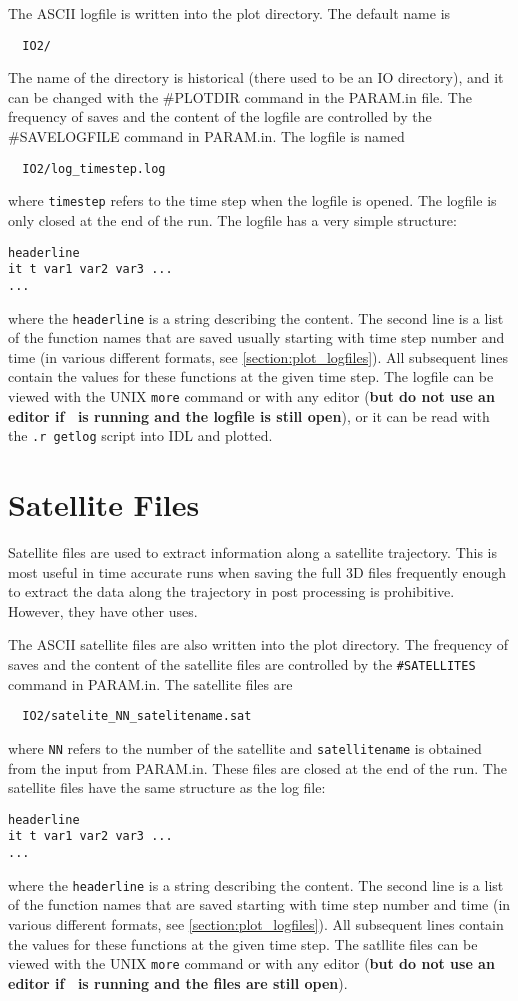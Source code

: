 The ASCII logfile is written into the plot directory. The default name is
\begin{verbatim}
  IO2/
\end{verbatim}
The name of the directory is historical (there used to be an IO directory),
and it can be changed with the \#PLOTDIR command in the PARAM.in file.
The frequency of saves and the content of the logfile are controlled by
the \#SAVELOGFILE command in PARAM.in. The logfile is named 
\begin{verbatim}
  IO2/log_timestep.log
\end{verbatim}
where {\tt timestep} refers to the time step when the logfile
is opened. The logfile is only closed at the end of the run.
The logfile has a very simple structure:
\begin{verbatim}
headerline
it t var1 var2 var3 ...
...
\end{verbatim}
where the {\tt headerline} is a string describing the content.
The second line is a list of the function names that are saved usually
starting with time step number and time (in various different formats, see
\ref{section:plot_logfiles}). 
All subsequent lines contain the values for these functions
at the given time step. The logfile can be viewed with the 
UNIX {\tt more} command or with any editor ({\bf but do not use an
editor if \BATSRUS\ is running and the logfile is still open}), 
or it can be read with the {\tt .r getlog} script into IDL and plotted.

\section{Satellite Files \label{section:satellitefiles}}

Satellite files  are used to extract information along a satellite
trajectory.  This is most useful in time accurate runs when 
saving the full 3D files frequently enough to extract the data along
the trajectory in post processing is prohibitive.  However, they
have other uses.

The ASCII satellite files are also written into the plot directory.
The frequency of saves and the content of the satellite files 
are controlled by the {\tt \#SATELLITES} command in PARAM.in. 
The satellite files are
\begin{verbatim}
  IO2/satelite_NN_satelitename.sat
\end{verbatim}
where {\tt NN} refers to the number of the satellite and 
{\tt satellitename} is obtained from the input from PARAM.in.
These files are closed at the end of the run.
The satellite files have the same structure as the log file:
\begin{verbatim}
headerline
it t var1 var2 var3 ...
...
\end{verbatim}
where the {\tt headerline} is a string describing the content.
The second line is a list of the function names that are saved
starting with time step number and time (in various different formats, see
\ref{section:plot_logfiles}). 
All subsequent lines contain the values for these functions
at the given time step. The satllite files can be viewed with the 
UNIX {\tt more} command or with any editor ({\bf but do not use an
editor if \BATSRUS\ is running and the files are  still open}). 


